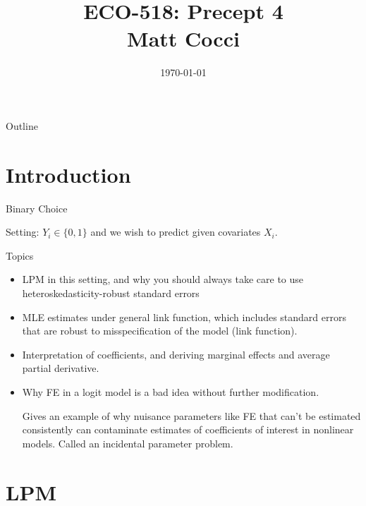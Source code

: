 \documentclass[aspectratio=169, handout]{beamer}
\title[]{ECO-518: Precept 4 \\ Matt Cocci}
\author[]{}
\date{\today}
\begin{document}
\begin{frame}[plain]
\titlepage
\end{frame}


\begin{frame}{Outline}
\tableofcontents[hideallsubsections]
\end{frame}


\section{Introduction}


{\footnotesize
\begin{frame}{Binary Choice}

Setting:
$Y_i\in\{0,1\}$ and we wish to predict given covariates $X_i$.

Topics
\begin{itemize}
  \item \alert{LPM} in this setting, and why you should always take care to use
    \alert{heteroskedasticity-robust standard errors}

  \item MLE estimates under \alert{general link function}, which
    includes standard errors that are \alert{robust} to misspecification
    of the model (link function).

  \item Interpretation of coefficients, and deriving
    \alert{marginal effects} and \alert{average partial derivative}.

  \item
    Why \alert{FE in a logit} model is a bad idea without further
    modification.

    Gives an example of why nuisance parameters like FE that can't be
    estimated consistently can contaminate estimates of coefficients of
    interest in nonlinear models.
    Called an \alert{incidental parameter problem}.
\end{itemize}
\end{frame}
}





\section{LPM}
\end{document}
